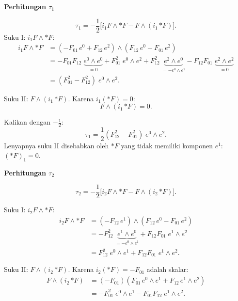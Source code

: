 \vspace{0.5em}
\noindent \textbf{Perhitungan $\tau_1$}

\begin{equation}
    \tau_1 = -\frac{1}{2}\Big[i_1 F \wedge {*F} - F \wedge (i_1\,{*F})\Big].
\end{equation}
Suku I: $i_1 F \wedge {*F}$:
\begin{align}
    i_1 F \wedge {*F} &= (-F_{01}\,e^0 + F_{12}\,e^2) \wedge (F_{12}\,e^0 - F_{01}\,e^2) \nonumber\\[4pt]
    &= -F_{01}F_{12}\;\underbrace{e^0 \wedge e^0}_{= 0}
    + F_{01}^2\;e^0 \wedge e^2
    + F_{12}^2\;\underbrace{e^2 \wedge e^0}_{= -e^0 \wedge e^2}
    - F_{12}F_{01}\;\underbrace{e^2 \wedge e^2}_{= 0} \nonumber\\[4pt]
    &= (F_{01}^2 - F_{12}^2)\;e^0 \wedge e^2.
\end{align}

Suku II: $F \wedge (i_1\,{*F})$. Karena $i_1({*F}) = 0$:
\begin{equation}
    F \wedge (i_1\,{*F}) = 0.
\end{equation}

Kalikan dengan $-\frac{1}{2}$:
\begin{equation}
    \tau_1 = \frac{1}{2}(F_{12}^2 - F_{01}^2)\;e^0 \wedge e^2. \label{mx45-eq:tau1}
\end{equation}
Lenyapnya suku II disebabkan oleh ${*F}$ yang tidak memiliki komponen $e^1$: $(*F)_1 = 0$.

\vspace{0.5em}
\noindent \textbf{Perhitungan $\tau_2$}

\begin{equation}
    \tau_2 = -\frac{1}{2}\Big[i_2 F \wedge {*F} - F \wedge (i_2\,{*F})\Big].
\end{equation}

Suku I: $i_2 F \wedge {*F}$:
\begin{align}
    i_2 F \wedge {*F} &= (-F_{12}\,e^1) \wedge (F_{12}\,e^0 - F_{01}\,e^2) \nonumber\\[4pt]
    &= -F_{12}^2\;\underbrace{e^1 \wedge e^0}_{= -e^0 \wedge e^1}
    + F_{12}F_{01}\;e^1 \wedge e^2 \nonumber\\[4pt]
    &= F_{12}^2\;e^0 \wedge e^1 + F_{12}F_{01}\;e^1 \wedge e^2.
\end{align}

Suku II: $F \wedge (i_2\,{*F})$. Karena $i_2({*F}) = -F_{01}$ adalah skalar:
\begin{align}
    F \wedge (i_2\,{*F}) &= (-F_{01})\!\left(F_{01}\,e^0 \wedge e^1 + F_{12}\,e^1 \wedge e^2\right) \nonumber\\[4pt]
    &= -F_{01}^2\;e^0 \wedge e^1 - F_{01}F_{12}\;e^1 \wedge e^2.
\end{align}

